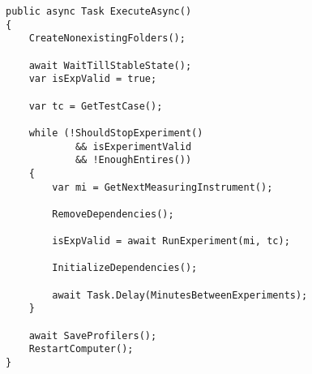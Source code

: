 
\begin{lstlisting}[caption=The method handeling dependencies and the validity of the results, label={lst:execute_async}]
public async Task ExecuteAsync()
{
    CreateNonexistingFolders();

    await WaitTillStableState();
    var isExpValid = true;

    var tc = GetTestCase();

    while (!ShouldStopExperiment() 
            && isExperimentValid 
            && !EnoughEntires())
    {
        var mi = GetNextMeasuringInstrument();

        RemoveDependencies();

        isExpValid = await RunExperiment(mi, tc);

        InitializeDependencies();

        await Task.Delay(MinutesBetweenExperiments);
    }

    await SaveProfilers();
    RestartComputer();
}
\end{lstlisting}